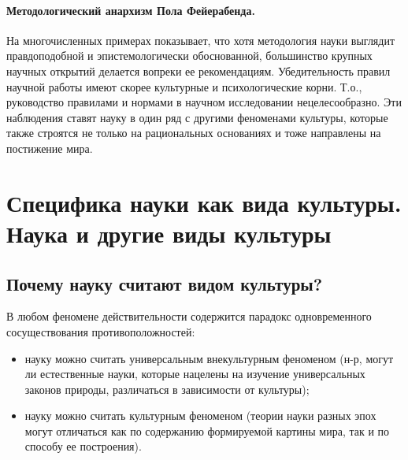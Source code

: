 \paragraph{Методологический анархизм Пола Фейерабенда.}
На многочисленных примерах показывает, что хотя методология науки выглядит правдоподобной и эпистемологически обоснованной, большинство крупных научных открытий делается вопреки ее
рекомендациям. Убедительность правил научной работы имеют скорее культурные и психологические корни. Т.о., руководство правилами и нормами в научном исследовании нецелесообразно.
Эти наблюдения ставят науку в один ряд с другими феноменами культуры, которые также строятся не только на рациональных основаниях и тоже направлены на постижение мира.

\section{Специфика науки как вида культуры. Наука и другие виды культуры}

\subsection{Почему науку считают видом культуры?} 

В любом феномене действительности содержится парадокс одновременного сосуществования противоположностей:
\begin{itemize}
    \item науку можно считать универсальным внекультурным феноменом (н-р, могут ли естественные
    науки, которые нацелены на изучение универсальных законов природы, различаться в зависимости от культуры);
    \item науку можно считать культурным феноменом (теории науки разных эпох могут отличаться как по содержанию формируемой картины мира, так и по способу ее построения).
\end{itemize}


